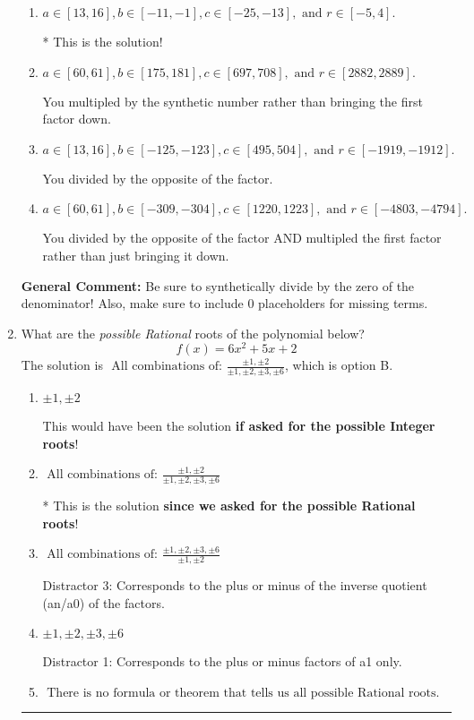 \documentclass{extbook}[14pt]
\newcommand{\litem}[1]{\item #1

\rule{\textwidth}{0.4pt}}
\begin{document}
\begin{enumerate}
{\begin{enumerate}[label=\Alph*.]
 You multipled by the synthetic number and subtracted rather than adding during synthetic division.
\item \( a \in [13, 16], b \in [-11, -1], c \in [-25, -13], \text{ and } r \in [-5, 4]. \)

* This is the solution!
\item \( a \in [60, 61], b \in [175, 181], c \in [697, 708], \text{ and } r \in [2882, 2889]. \)

 You multipled by the synthetic number rather than bringing the first factor down.
\item \( a \in [13, 16], b \in [-125, -123], c \in [495, 504], \text{ and } r \in [-1919, -1912]. \)

 You divided by the opposite of the factor.
\item \( a \in [60, 61], b \in [-309, -304], c \in [1220, 1223], \text{ and } r \in [-4803, -4794]. \)

 You divided by the opposite of the factor AND multipled the first factor rather than just bringing it down.
\end{enumerate}

\textbf{General Comment:} Be sure to synthetically divide by the zero of the denominator! Also, make sure to include 0 placeholders for missing terms.
}
\litem{
What are the \textit{possible Rational} roots of the polynomial below?
\[ f(x) = 6x^{2} +5 x + 2 \]The solution is \( \text{ All combinations of: }\frac{\pm 1,\pm 2}{\pm 1,\pm 2,\pm 3,\pm 6} \), which is option B.\begin{enumerate}[label=\Alph*.]
\item \( \pm 1,\pm 2 \)

This would have been the solution \textbf{if asked for the possible Integer roots}!
\item \( \text{ All combinations of: }\frac{\pm 1,\pm 2}{\pm 1,\pm 2,\pm 3,\pm 6} \)

* This is the solution \textbf{since we asked for the possible Rational roots}!
\item \( \text{ All combinations of: }\frac{\pm 1,\pm 2,\pm 3,\pm 6}{\pm 1,\pm 2} \)

 Distractor 3: Corresponds to the plus or minus of the inverse quotient (an/a0) of the factors. 
\item \( \pm 1,\pm 2,\pm 3,\pm 6 \)

 Distractor 1: Corresponds to the plus or minus factors of a1 only.
\item \( \text{ There is no formula or theorem that tells us all possible Rational roots.} \)


\end{enumerate}}
\end{enumerate}
\end{document}
